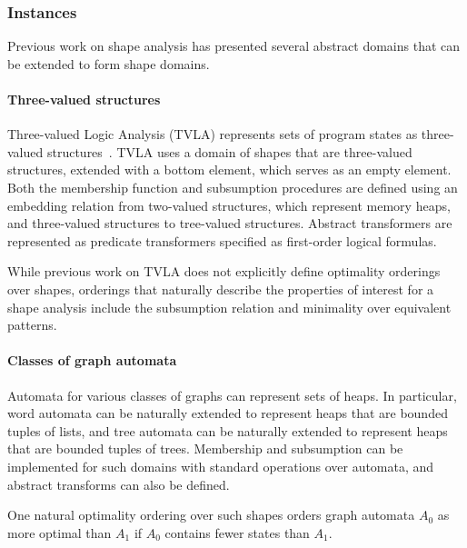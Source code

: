 \subsubsection{Instances}
\label{sec:shape-instances}
%
Previous work on shape analysis has presented several abstract domains
that can be extended to form shape domains.
%
\paragraph{Three-valued structures}
%
Three-valued Logic Analysis (TVLA) represents sets of program states
as three-valued structures~\cite{sagiv02}.
%
TVLA uses a domain of shapes that are three-valued structures,
extended with a bottom element, which serves as an empty element.
%
Both the membership function and subsumption procedures are
defined using an embedding relation from two-valued structures, which
represent memory heaps, and three-valued structures to tree-valued
structures.
%
Abstract transformers are represented as predicate transformers
specified as first-order logical formulas.

While previous work on TVLA does not explicitly define optimality
orderings over shapes, orderings that naturally describe the
properties of interest for a shape analysis include the subsumption
relation and minimality over equivalent patterns.

\paragraph{Classes of graph automata}
%
Automata for various classes of graphs can represent sets of heaps.
%
In particular, word automata can be naturally extended to represent
heaps that are bounded tuples of lists, and tree automata can be
naturally extended to represent heaps that are bounded tuples of
trees.
%
Membership and subsumption can be implemented for such domains with
standard operations over automata, and abstract transforms can also be
defined.

One natural optimality ordering over such shapes orders graph automata
$A_0$ as more optimal than $A_1$ if $A_0$ contains fewer states than
$A_1$.

